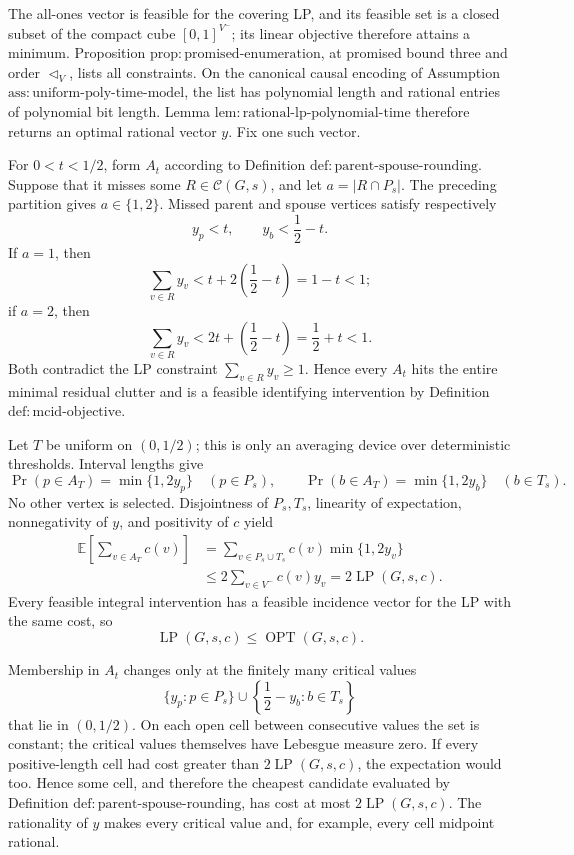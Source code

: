 The all-ones vector is feasible for the covering LP, and its feasible set
is a closed subset of the compact cube \([0,1]^{V^{-}}\); its linear
objective therefore attains a minimum.  Proposition
\(\mathrm{prop{:}promised\mbox{-}enumeration}\), at promised bound three
and order \(\triangleleft_V\), lists all constraints.  On the canonical
causal encoding of Assumption
\(\mathrm{ass{:}uniform\mbox{-}poly\mbox{-}time\mbox{-}model}\), the list
has polynomial length and rational entries of polynomial bit length.
Lemma \(\mathrm{lem{:}rational\mbox{-}lp\mbox{-}polynomial\mbox{-}time}\)
therefore returns an optimal rational vector \(y\).  Fix one such vector.

For \(0<t<1/2\), form \(A_t\) according to Definition
\(\mathrm{def{:}parent\mbox{-}spouse\mbox{-}rounding}\).  Suppose that it
misses some \(R\in\mathcal C(G,s)\), and let
\(a=|R\cap P_s|\).  The preceding partition gives \(a\in\{1,2\}\).
Missed parent and spouse vertices satisfy respectively
\[
 y_p<t,
 \qquad y_b<\frac12-t.
\]
If \(a=1\), then
\[
 \sum_{v\in R}y_v
 <t+2\left(\frac12-t\right)=1-t<1;
\]
if \(a=2\), then
\[
 \sum_{v\in R}y_v
 <2t+\left(\frac12-t\right)=\frac12+t<1.
\]
Both contradict the LP constraint \(\sum_{v\in R}y_v\geq1\).  Hence every
\(A_t\) hits the entire minimal residual clutter and is a feasible
identifying intervention by Definition
\(\mathrm{def{:}mcid\mbox{-}objective}\).

Let \(T\) be uniform on \((0,1/2)\); this is only an averaging device over
deterministic thresholds.  Interval lengths give
\[
 \Pr(p\in A_T)=\min\{1,2y_p\}\quad(p\in P_s),
 \qquad
 \Pr(b\in A_T)=\min\{1,2y_b\}\quad(b\in T_s).
\]
No other vertex is selected.  Disjointness of \(P_s,T_s\), linearity of
expectation, nonnegativity of \(y\), and positivity of \(c\) yield
\[
 \begin{aligned}
 \mathbb E\!\left[\sum_{v\in A_T}c(v)\right]
 &=\sum_{v\in P_s\cup T_s}c(v)\min\{1,2y_v\}\\
 &\leq2\sum_{v\in V^{-}}c(v)y_v
 =2\operatorname{LP}(G,s,c).
 \end{aligned}
\]
Every feasible integral intervention has a feasible incidence vector for
the LP with the same cost, so
\[
 \operatorname{LP}(G,s,c)\leq\operatorname{OPT}(G,s,c).
\]

Membership in \(A_t\) changes only at the finitely many critical values
\[
 \{y_p:p\in P_s\}\cup
 \left\{\frac12-y_b:b\in T_s\right\}
\]
that lie in \((0,1/2)\).  On each open cell between consecutive values the
set is constant; the critical values themselves have Lebesgue measure zero.
If every positive-length cell had cost greater than
\(2\operatorname{LP}(G,s,c)\), the expectation would too.  Hence some
cell, and therefore the cheapest candidate evaluated by Definition
\(\mathrm{def{:}parent\mbox{-}spouse\mbox{-}rounding}\), has cost at most
\(2\operatorname{LP}(G,s,c)\).  The rationality of \(y\) makes every
critical value and, for example, every cell midpoint rational.

